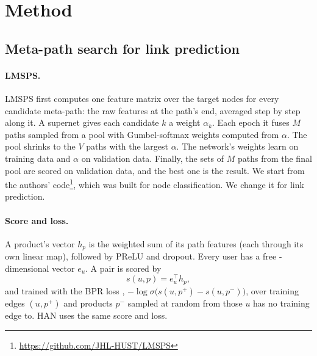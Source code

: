 \section{Method}
\label{sec:method}

\subsection{Meta-path search for link prediction}
\label{sec:search}

\paragraph{LMSPS\@.} LMSPS \citep{li2024longrange} first computes one feature matrix over the
target nodes for every candidate meta-path: the raw features at the path's end, averaged step by
step along it. A supernet gives each candidate $k$ a weight $\alpha_k$. Each epoch it fuses $M$
paths sampled from a pool with Gumbel-softmax weights computed from $\alpha$. The pool shrinks to
the $V$ paths with the largest $\alpha$. The network's weights learn on training data and $\alpha$
on validation data. Finally, the sets of $M$ paths from the final pool are scored on validation
data, and the best one is the result. We start from the authors'
code\footnote{\url{https://github.com/JHL-HUST/LMSPS}}, which was built for node classification. We
change it for link prediction.

\paragraph{Score and loss.} A product's vector $h_p$ is the weighted sum of its path features (each
through its own linear map), followed by PReLU and dropout. Every user has a free
-dimensional vector $e_u$. A pair is scored by
\begin{equation}
  s(u, p) = e_u^{\top} h_p ,
  \label{eq:score}
\end{equation}
and trained with the BPR loss \citep{rendle2009bpr}, $-\log \sigma\bigl(s(u, p^{+}) - s(u,
p^{-})\bigr)$, over training edges $(u, p^{+})$ and products $p^{-}$ sampled at random from those
$u$ has no training edge to. HAN uses the same score and loss.

